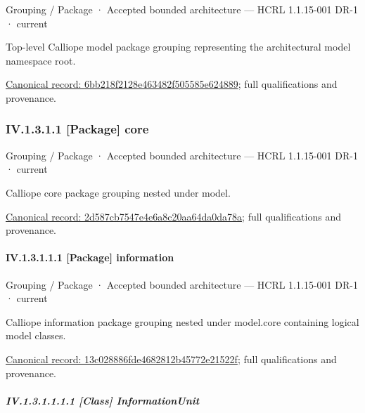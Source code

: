 \label{element:6bb218f2128e463482f505585e624889}
{\small Grouping / Package · Accepted bounded architecture — HCRL 1.1.15-001 DR-1 · current}\par

Top-level Calliope model package grouping representing the architectural model namespace root.


{\footnotesize \href{../../../../../../../../continuum/grouping/package/6bb218f2128e463482f505585e624889.md}{Canonical record: 6bb218f2128e463482f505585e624889}; full qualifications and provenance.}\par
\subsubsection*{IV.1.3.1.1 [Package] core}
\label{navigation:IV.1.3.1.1}

\label{element:2d587cb7547e4e6a8c20aa64da0da78a}
{\small Grouping / Package · Accepted bounded architecture — HCRL 1.1.15-001 DR-1 · current}\par

Calliope core package grouping nested under model.


{\footnotesize \href{../../../../../../../../continuum/grouping/package/2d587cb7547e4e6a8c20aa64da0da78a.md}{Canonical record: 2d587cb7547e4e6a8c20aa64da0da78a}; full qualifications and provenance.}\par
\paragraph*{IV.1.3.1.1.1 [Package] information}
\label{navigation:IV.1.3.1.1.1}

\label{element:13c028886fde4682812b45772e21522f}
{\small Grouping / Package · Accepted bounded architecture — HCRL 1.1.15-001 DR-1 · current}\par

Calliope information package grouping nested under model.core containing logical model classes.


{\footnotesize \href{../../../../../../../../continuum/grouping/package/13c028886fde4682812b45772e21522f.md}{Canonical record: 13c028886fde4682812b45772e21522f}; full qualifications and provenance.}\par
\subparagraph*{IV.1.3.1.1.1.1 [Class] InformationUnit}
\label{navigation:IV.1.3.1.1.1.1}

